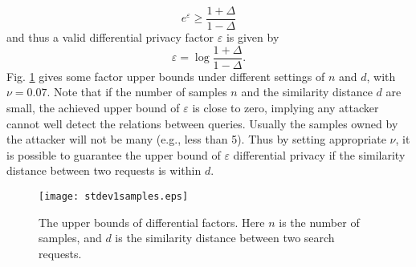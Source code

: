 \documentclass{IEEEtran}
\begin{document}
$$e^\varepsilon \geq \frac{1+\Delta}{1-\Delta}$$
and thus a valid differential privacy factor $\varepsilon$ is given by
$$\varepsilon = \log \frac{1+\Delta}{1-\Delta}.$$
Fig. \ref{fig:diff_factors} gives some factor upper bounds under different settings of $n$ and $d$, with $\nu=0.07$. Note that if the number of samples $n$ and the similarity distance $d$ are small, the achieved upper bound of $\varepsilon$ is close to zero, implying any attacker cannot well detect the relations between queries. Usually the samples owned by the attacker will not be many (e.g., less than 5). Thus by setting appropriate $\nu$, it is possible to guarantee the upper bound of $\varepsilon$ differential privacy if the similarity distance between two requests is within $d$.

\begin{figure}
\centering
\texttt{[image: stdev1samples.eps]}
\caption{The upper bounds of differential factors. Here $n$ is the number of samples, and $d$ is the similarity distance between two search requests.}
\label{fig:diff_factors}
\end{figure}



\end{document}
